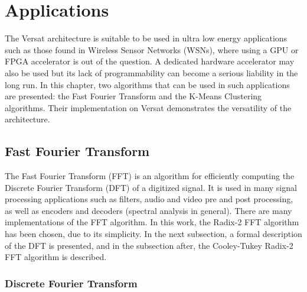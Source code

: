 
\chapter{Applications}
\label{chapter:applications}

The Versat architecture is suitable to be used in ultra low energy
applications such as those found in Wireless Sensor Networks (WSNs),
where using a GPU or FPGA accelerator is out of the question. A
dedicated hardware accelerator may also be used but its lack of
programmability can become a serious liability in the long run. In
this chapter, two algorithms that can be used in such applications are
presented: the Fast Fourier Transform and the K-Means Clustering
algorithms. Their implementation on Versat demonstrates the
versatility of the architecture.

\section{Fast Fourier Transform }
\label{section:FFT}

The Fast Fourier Transform (FFT) is an algorithm for efficiently
computing the Discrete Fourier Transform (DFT) of a digitized
signal. It is used in many signal processing applications such as
filters, audio and video pre and post processing, as well as encoders
and decoders (spectral analysis in general). There are many
implementations of the FFT algorithm. In this work, the Radix-2 FFT
algorithm has been chosen, due to its simplicity. In the next subsection,
a formal description of the DFT is presented, and in the subsection
after, the Cooley-Tukey Radix-2 FFT algorithm is described.

\subsection{Discrete Fourier Transform}
\label{subsection:DFT}

